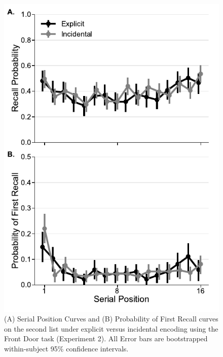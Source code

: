 \documentclass[man,natbib,floatsintext]{apa6} %
\begin{document}
\newcommand\spcpaneltext{All Error bars are bootstrapped within-subject 95\% confidence intervals.}


\newcommand\paneltext{(A) Lag-conditional response probability functions. Error bars are bootstrapped within-subject 95\% confidence intervals. (B) The average z(TCE).  Error bars are bootstrapped between-subject 95\% confidence intervals. z(TCE) for a given subject is computed as follows: An observed temporal factor score was computed as the average percentile ranking the temporal lag of each actual transition in the recall sequence with respect to the lags of all transitions that were possible at that time. To determine the temporal factor score expected by chance, a permutation distribution was created by randomly shuffling the order of recalls within the sequence 10,000 times and computing a temporal factor score for each shuffling. The reported value, z(TCE), is z-score of the observed temporal factor score within the permutation distribution.}

\begin{figure}
\includegraphics{figures/E2_spc_list2.pdf}
\caption{(A) Serial Position Curves and (B) Probability of First Recall curves on the second list under explicit versus incidental encoding using the Front Door task (Experiment 2). \spcpaneltext}
\label{e2_l2_spc}
\end{figure}
\end{document}
